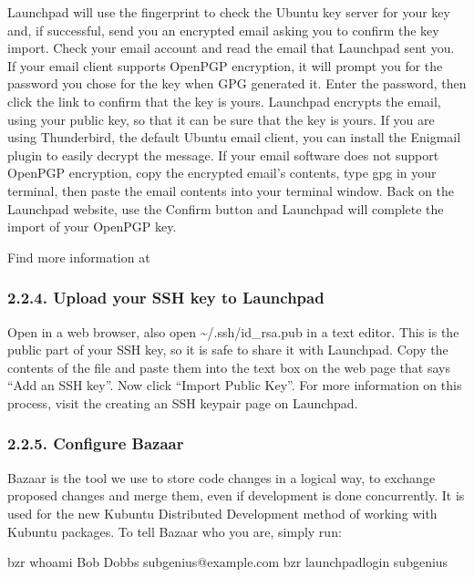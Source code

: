 \documentclass[letterpaper,10pt,english]{sphinxmanual}
\begin{document}
Launchpad will use the fingerprint to check the Ubuntu key server for your key and, if successful, send you an encrypted email asking you to confirm the key import. Check your email account and read the email that Launchpad sent you. If your email client supports OpenPGP encryption, it will prompt you for the password you chose for the key when GPG generated it. Enter the password, then click the link to confirm that the key is yours.
Launchpad encrypts the email, using your public key, so that it can be sure that the key is yours. If you are using Thunderbird, the default Ubuntu email client, you can install the Enigmail plugin to easily decrypt the message. If your email software does not support OpenPGP encryption, copy the encrypted email’s contents, type gpg in your terminal, then paste the email contents into your terminal window.
Back on the Launchpad website, use the Confirm button and Launchpad will complete the import of your OpenPGP key.

Find more information at 


\subsubsection{2.2.4. Upload your SSH key to Launchpad}
\label{\detokenize{docs/packaging_guide/getting_started:upload-your-ssh-key-to-launchpad}}
Open  in a web browser, also open \textasciitilde{}/.ssh/id\_rsa.pub in a text editor. This is the public part of your SSH key, so it is safe to share it with Launchpad. Copy the contents of the file and paste them into the text box on the web page that says “Add an SSH key”. Now click “Import Public Key”.
For more information on this process, visit the creating an SSH keypair page on Launchpad.


\subsubsection{2.2.5. Configure Bazaar}
\label{\detokenize{docs/packaging_guide/getting_started:configure-bazaar}}
Bazaar is the tool we use to store code changes in a logical way, to exchange proposed changes and merge them, even if development is done concurrently. It is used for the new Kubuntu Distributed Development method of working with Kubuntu packages.
To tell Bazaar who you are, simply run:

\begin{sphinxVerbatim}[commandchars=\\\{\}]
\PYGZdl{} bzr whoami \PYGZdq{}Bob Dobbs \PYGZlt{}subgenius@example.com\PYGZgt{}\PYGZdq{}
\PYGZdl{} bzr launchpad\PYGZhy{}login subgenius
\end{sphinxVerbatim}
\end{document}
